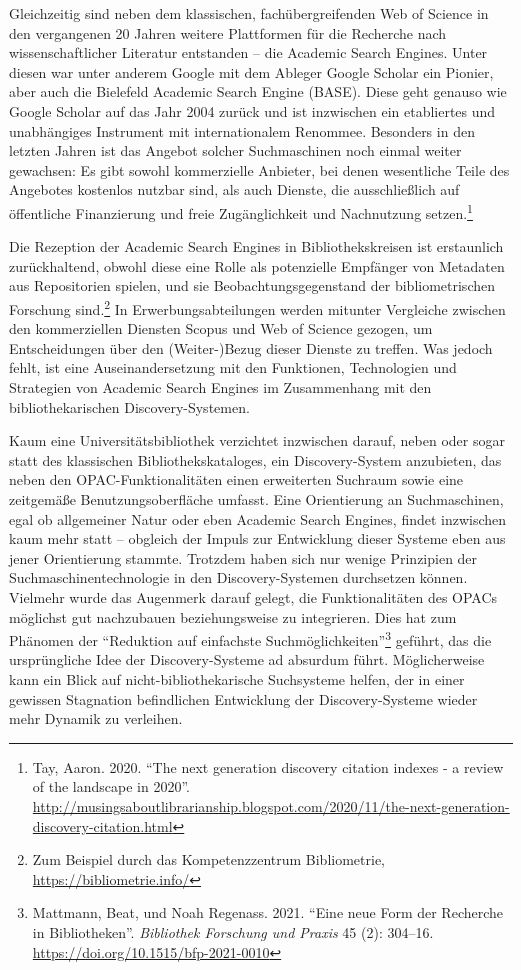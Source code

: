 \documentclass[a4paper,
fontsize=11pt,
oneside,
numbers=noperiodatend,
parskip=half-,
bibliography=totoc,
final
]{scrartcl}
\begin{document}
Gleichzeitig sind neben dem klassischen, fachübergreifenden Web of
Science in den vergangenen 20 Jahren weitere Plattformen für die
Recherche nach wissenschaftlicher Literatur entstanden -- die Academic
Search Engines. Unter diesen war unter anderem Google mit dem Ableger
Google Scholar ein Pionier, aber auch die Bielefeld Academic Search
Engine (BASE). Diese geht genauso wie Google Scholar auf das Jahr 2004
zurück und ist inzwischen ein etabliertes und unabhängiges Instrument
mit internationalem Renommee. Besonders in den letzten Jahren ist das
Angebot solcher Suchmaschinen noch einmal weiter gewachsen: Es gibt
sowohl kommerzielle Anbieter, bei denen wesentliche Teile des Angebotes
kostenlos nutzbar sind, als auch Dienste, die ausschließlich auf
öffentliche Finanzierung und freie Zugänglichkeit und Nachnutzung
setzen.\footnote{Tay, Aaron. 2020. \enquote{The next generation
  discovery citation indexes - a review of the landscape in 2020}.
  \url{http://musingsaboutlibrarianship.blogspot.com/2020/11/the-next-generation-discovery-citation.html}}

Die Rezeption der Academic Search Engines in Bibliothekskreisen ist
erstaunlich zurückhaltend, obwohl diese eine Rolle als potenzielle
Empfänger von Metadaten aus Repositorien spielen, und sie
Beobachtungsgegenstand der bibliometrischen Forschung sind.\footnote{Zum
  Beispiel durch das Kompetenzzentrum Bibliometrie,
  \url{https://bibliometrie.info/}} In Erwerbungsabteilungen werden
mitunter Vergleiche zwischen den kommerziellen Diensten Scopus und Web
of Science gezogen, um Entscheidungen über den (Weiter-)Bezug dieser
Dienste zu treffen. Was jedoch fehlt, ist eine Auseinandersetzung mit
den Funktionen, Technologien und Strategien von Academic Search Engines
im Zusammenhang mit den bibliothekarischen Discovery-Systemen.

Kaum eine Universitätsbibliothek verzichtet inzwischen darauf, neben
oder sogar statt des klassischen Bibliothekskataloges, ein
Discovery-System anzubieten, das neben den OPAC-Funktio\-nalitäten einen
erweiterten Suchraum sowie eine zeitgemäße Benutzungsoberfläche umfasst.
Eine Orientierung an Suchmaschinen, egal ob allgemeiner Natur oder eben
Academic Search Engines, findet inzwischen kaum mehr statt -- obgleich
der Impuls zur Entwicklung dieser Systeme eben aus jener Orientierung
stammte. Trotzdem haben sich nur wenige Prinzipien der
Suchmaschinentechnologie in den Discovery-Systemen durchsetzen können.
Vielmehr wurde das Augenmerk darauf gelegt, die Funktionalitäten des
OPACs möglichst gut nachzubauen beziehungsweise zu integrieren. Dies hat
zum Phänomen der \enquote{Reduktion auf einfachste
Suchmöglichkeiten}\footnote{Mattmann, Beat, und Noah Regenass. 2021.
  \enquote{Eine neue Form der Recherche in Bibliotheken}.
  \emph{Bibliothek Forschung und Praxis} 45 (2): 304--16.
  \url{https://doi.org/10.1515/bfp-2021-0010}} geführt, das die
ursprüngliche Idee der Discovery-Systeme ad absurdum führt.
Möglicherweise kann ein Blick auf nicht-bibliothekarische Suchsysteme
helfen, der in einer gewissen Stagnation befindlichen Entwicklung der
Discovery-Systeme wieder mehr Dynamik zu verleihen.
\end{document}
